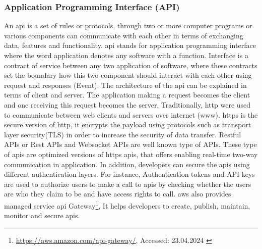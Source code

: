 \subsubsection{Application Programming Interface (API)}
An \acrshort{api} is a set of rules or protocols, through two or more computer programs or various components can communicate with each other in terms of exchanging data, features and functionality.  \acrshort{api} stands for application programming interface where the word application denotes any software with a function. Interface is a contract of service between any two application of software, where these contracts set the boundary how this two component should interact with each other using request and responses (Event). The architecture of the \acrshort{api} can be explained in terms of client and server. The application making a request becomes the client and one receiving this request becomes the server. Traditionally, \acrfull{http} were used to communicate between web clients and servers over internet (\acrshort{www}). \acrshort{https} is the secure version of \acrshort{http}, it encrypts the payload using protocols such as transport layer security(TLS) in order to increase the security of data transfer. Restful APIs or Rest APIs and Websocket APIs are well known type of APIs. These type of \acrshort{api}s are optimized versions of \acrshort{https} \acrshort{api}s, that offers enabling real-time two-way communication in application. In addition, developers can secure the \acrshort{api}s using different authentication layers. For instance, Authentication tokens and API keys are used to authorize users to make a call to \acrshort{api}s by checking whether the users are who they claim to be and have access rights to call. \acrshort{aws} also provides managed service \acrshort{api} Gateway\footnote{\url{https://aws.amazon.com/api-gateway/}, Accessed: 23.04.2024 \label{api_gateway}}, It helps developers to create, publish, maintain, monitor and secure \acrshort{api}s. 




